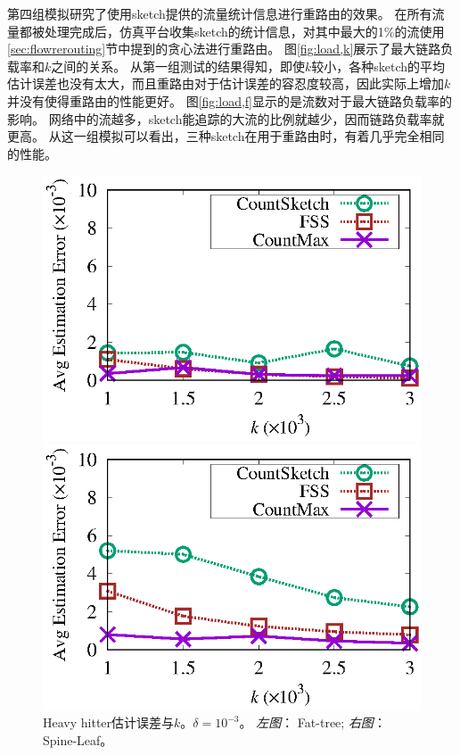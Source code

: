 第四组模拟研究了使用sketch提供的流量统计信息进行重路由的效果。
在所有流量都被处理完成后，仿真平台收集sketch的统计信息，对其中最大的1\%的流使用\ref{sec:flowrerouting}节中提到的贪心法进行重路由。
图\ref{fig:load,k}展示了最大链路负载率和$k$之间的关系。
从第一组测试的结果得知，即使$k$较小，各种sketch的平均估计误差也没有太大，而且重路由对于估计误差的容忍度较高，因此实际上增加$k$并没有使得重路由的性能更好。
图\ref{fig:load,f}显示的是流数对于最大链路负载率的影响。
网络中的流越多，sketch能追踪的大流的比例就越少，因而链路负载率就更高。
从这一组模拟可以看出，三种sketch在用于重路由时，有着几乎完全相同的性能。

\begin{figure}[!t]
	\centering
	\begin{minipage}[t]{0.49\linewidth}
		\centering
		\includegraphics[width=\linewidth]{fig/ft_k_hh_1000.eps}
	\end{minipage}\vspace{-0.6em}%
	\begin{minipage}[t]{0.49\linewidth}
		\centering
		\includegraphics[width=\linewidth]{fig/hy_k_hh_1000.eps}
	\end{minipage}\vspace{-0.6em}%
	\caption{\textnormal{Heavy hitter估计误差与$k$。$\delta=10^{-3}$。 \textit{左图}： Fat-tree; \textit{右图}： Spine-Leaf。}}
	\label{fig:hh,k,1000}
\end{figure}


